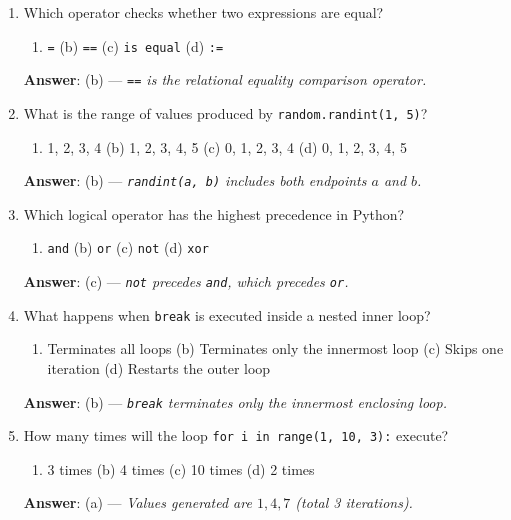 \begin{enumerate}[leftmargin=1.5em]
    \item Which operator checks whether two expressions are equal?
    \begin{enumerate}[label=(\alph*)]
        \item \texttt{=} \quad (b) \texttt{==} \quad (c) \texttt{is equal} \quad (d) \texttt{:=}
    \end{enumerate}
    \textbf{Answer}: (b) --- \textit{\texttt{==} is the relational equality comparison operator.}

    \item What is the range of values produced by \texttt{random.randint(1, 5)}?
    \begin{enumerate}[label=(\alph*)]
        \item 1, 2, 3, 4 \quad (b) 1, 2, 3, 4, 5 \quad (c) 0, 1, 2, 3, 4 \quad (d) 0, 1, 2, 3, 4, 5
    \end{enumerate}
    \textbf{Answer}: (b) --- \textit{\texttt{randint(a, b)} includes both endpoints $a$ and $b$.}

    \item Which logical operator has the highest precedence in Python?
    \begin{enumerate}[label=(\alph*)]
        \item \texttt{and} \quad (b) \texttt{or} \quad (c) \texttt{not} \quad (d) \texttt{xor}
    \end{enumerate}
    \textbf{Answer}: (c) --- \textit{\texttt{not} precedes \texttt{and}, which precedes \texttt{or}.}

    \item What happens when \texttt{break} is executed inside a nested inner loop?
    \begin{enumerate}[label=(\alph*)]
        \item Terminates all loops \quad (b) Terminates only the innermost loop \quad (c) Skips one iteration \quad (d) Restarts the outer loop
    \end{enumerate}
    \textbf{Answer}: (b) --- \textit{\texttt{break} terminates only the innermost enclosing loop.}

    \item How many times will the loop \texttt{for i in range(1, 10, 3):} execute?
    \begin{enumerate}[label=(\alph*)]
        \item 3 times \quad (b) 4 times \quad (c) 10 times \quad (d) 2 times
    \end{enumerate}
    \textbf{Answer}: (a) --- \textit{Values generated are $1, 4, 7$ (total 3 iterations).}


\end{enumerate}
